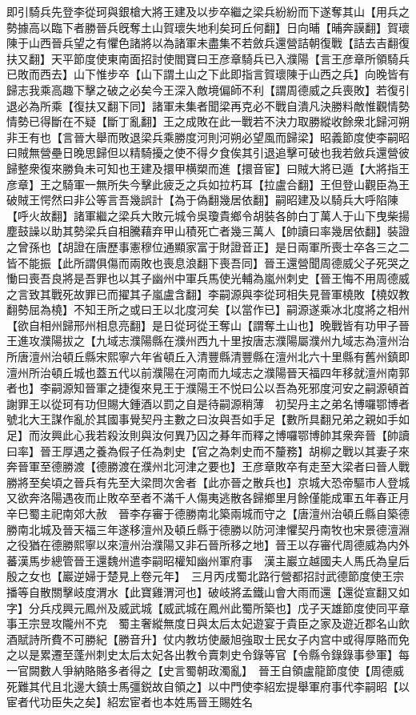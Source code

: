 即引騎兵先登李從珂與銀槍大將王建及以步卒繼之梁兵紛紛而下遂奪其山【用兵之勢據高以臨下者勝晉兵旣奪土山賀瓌失地利矣珂丘何翻】日向晡【晡奔謨翻】賀瓌陳于山西晉兵望之有懼色諸將以為諸軍未盡集不若斂兵還營詰朝復戰【詰去吉翻復扶又翻】天平節度使東南面招討使閻寶曰王彦章騎兵已入濮陽【言王彦章所領騎兵已敗而西去】山下惟步卒【山下謂土山之下此即指言賀瓌陳于山西之兵】向晚皆有歸志我乘高趣下擊之破之必矣今王深入敵境偏師不利【謂周德威之兵喪敗】若復引退必為所乘【復扶又翻下同】諸軍未集者聞梁再克必不戰自潰凡決勝料敵惟觀情勢情勢已得斷在不疑【斷丁亂翻】王之成敗在此一戰若不決力取勝縱收餘衆北歸河朔非王有也【言晉大舉而敗退梁兵乘勝度河則河朔必望風而歸梁】昭義節度使李嗣昭曰賊無營壘日晚思歸但以精騎擾之使不得夕食俟其引退追擊可破也我若斂兵還營彼歸整衆復來勝負未可知也王建及擐甲横槊而進【擐音宦】曰賊大將已遁【大將指王彦章】王之騎軍一無所失今擊此疲乏之兵如拉朽耳【拉盧合翻】王但登山觀臣為王破賊王愕然曰非公等言吾幾誤計【為于偽翻幾居依翻】嗣昭建及以騎兵大呼陷陳【呼火故翻】諸軍繼之梁兵大敗元城令吳瓊貴鄉令胡裝各帥白丁萬人于山下曳柴揚塵鼓譟以助其勢梁兵自相騰藉弃甲山積死亡者幾三萬人【帥讀曰率幾居依翻】裝證之曾孫也【胡證在唐歷事憲穆位通顯家富于財證音正】是日兩軍所喪士卒各三之二皆不能振【此所謂俱傷而兩敗也喪息浪翻下喪吾同】晉王還營聞周德威父子死哭之慟曰喪吾良將是吾罪也以其子幽州中軍兵馬使光輔為嵐州刺史【晉王悔不用周德威之言致其戰死故罪已而擢其子嵐盧含翻】李嗣源與李從珂相失見晉軍橈敗【橈奴教翻勢屈為橈】不知王所之或曰王以北度河矣【以當作已】嗣源遂乘冰北度將之相州【欲自相州歸邢州相息亮翻】是日從珂從王奪山【謂奪土山也】晚戰皆有功甲子晉王進攻濮陽拔之【九域志濮陽縣在濮州西九十里按唐志濮陽屬濮州九域志為澶州治所唐澶州治頓丘縣宋熙寧六年省頓丘入清豐縣清豐縣在澶州北六十里縣有舊州鎮即澶州所治頓丘城也蓋五代以前濮陽在河南而九域志之濮陽晉天福四年移就澶州南郭者也】李嗣源知晉軍之捷復來見王于濮陽王不悦曰公以吾為死邪度河安之嗣源頓首謝罪王以從珂有功但賜大鍾酒以罰之自是待嗣源稍薄　初契丹主之弟名博囉鄂博者號北大王謀作亂於其國事覺契丹主數之曰汝與吾如手足【數所具翻兄弟之親如手如足】而汝興此心我若殺汝則與汝何異乃囚之朞年而釋之博囉鄂博帥其衆奔晉【帥讀曰率】晉王厚遇之養為假子任為刺史【官之為刺史而不釐務】胡柳之戰以其妻子來奔晉軍至德勝渡【德勝渡在濮州北河津之要也】王彦章敗卒有走至大梁者曰晉人戰勝將至矣頃之晉兵有先至大梁問次舍者【此亦晉之散兵也】京城大恐帝驅市人登城又欲奔洛陽遇夜而止敗卒至者不滿千人傷夷逃散各歸鄉里月餘僅能成軍五年春正月辛巳蜀主祀南郊大赦　晉李存審于德勝南北築兩城而守之【唐澶州治頓丘縣自築德勝南北城及晉天福三年遂移澶州及頓丘縣于德勝以防河津懼契丹南牧也宋景德澶淵之役猶在德勝熙寧以來澶州治濮陽又非石晉所移之地】晉王以存審代周德威為内外蕃漢馬步總管晉王還魏州遣李嗣昭權知幽州軍府事　漢主巖立越國夫人馬氏為皇后殷之女也【巖逆婦于楚見上卷元年】　三月丙戌蜀北路行營都招討武德節度使王宗播等自散關擊岐度渭水【此寶雞渭河也】破岐將孟鐵山會大雨而還【還從宣翻又如字】分兵戍興元鳳州及威武城【威武城在鳳州此蜀所築也】戊子天雄節度使同平章事王宗昱攻隴州不克　蜀主奢縱無度日與太后太妃遊宴于貴臣之家及遊近郡名山飲酒賦詩所費不可勝紀【勝音升】仗内教坊使嚴旭強取士民女子内宫中或得厚賂而免之以是累遷至蓬州刺史太后太妃各出教令賣刺史令錄等官【令縣令錄錄事參軍】每一官闕數人爭納賂賂多者得之【史言蜀朝政濁亂】　晉王自領盧龍節度使【周德威死難其代且北邊大鎮士馬彊鋭故自領之】以中門使李紹宏提舉軍府事代李嗣昭【以宦者代功臣失之矣】紹宏宦者也本姓馬晉王賜姓名
